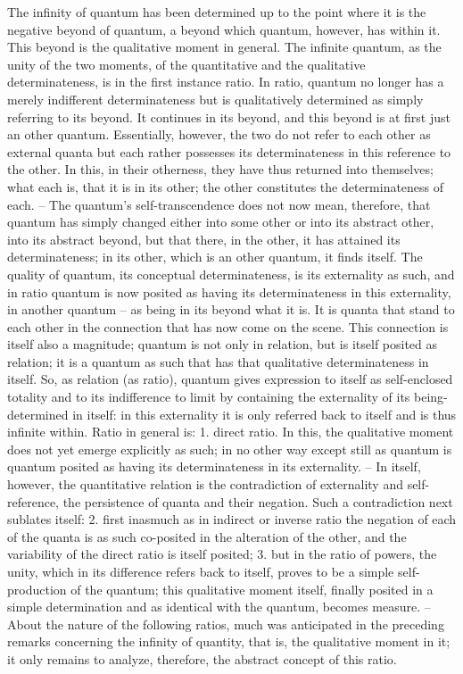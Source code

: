 The infinity of quantum has been determined up to the point where it is
the negative beyond of quantum, a beyond which quantum, however, has
within it. This beyond is the qualitative moment in general. The infinite
quantum, as the unity of the two moments, of the quantitative and the
qualitative determinateness, is in the first instance ratio.
In ratio, quantum no longer has a merely indifferent determinateness but
is qualitatively determined as simply referring to its beyond. It continues
in its beyond, and this beyond is at first just an other quantum. Essentially,
however, the two do not refer to each other as external quanta but each
rather possesses its determinateness in this reference to the other. In this, in
their otherness, they have thus returned into themselves; what each is,
that it is in its other; the other constitutes the determinateness of each. –
The quantum’s self-transcendence does not now mean, therefore, that
quantum has simply changed either into some other or into its abstract
other, into its abstract beyond, but that there, in the other, it has attained
its determinateness; in its other, which is an other quantum, it finds itself.
The quality of quantum, its conceptual determinateness, is its externality
as such, and in ratio quantum is now posited as having its determinateness
in this externality, in another quantum – as being in its beyond what it is.
It is quanta that stand to each other in the connection that has now come
on the scene. This connection is itself also a magnitude; quantum is not only
in relation, but is itself posited as relation; it is a quantum as such that has
that qualitative determinateness in itself. So, as relation (as ratio), quantum
gives expression to itself as self-enclosed totality and to its indifference to
limit by containing the externality of its being-determined in itself: in this
externality it is only referred back to itself and is thus infinite within.
Ratio in general is:
1. direct ratio. In this, the qualitative moment does not yet emerge explicitly
as such; in no other way except still as quantum is quantum posited
as having its determinateness in its externality. – In itself, however, the
quantitative relation is the contradiction of externality and self-reference,
the persistence of quanta and their negation. Such a contradiction next
sublates itself:
2. first inasmuch as in indirect or inverse ratio the negation of each of
the quanta is as such co-posited in the alteration of the other, and the
variability of the direct ratio is itself posited;
3. but in the ratio of powers, the unity, which in its difference refers back
to itself, proves to be a simple self-production of the quantum; this
qualitative moment itself, finally posited in a simple determination and
as identical with the quantum, becomes measure.
– About the nature of the following ratios, much was anticipated in
the preceding remarks concerning the infinity of quantity, that is, the
qualitative moment in it; it only remains to analyze, therefore, the abstract
concept of this ratio.

